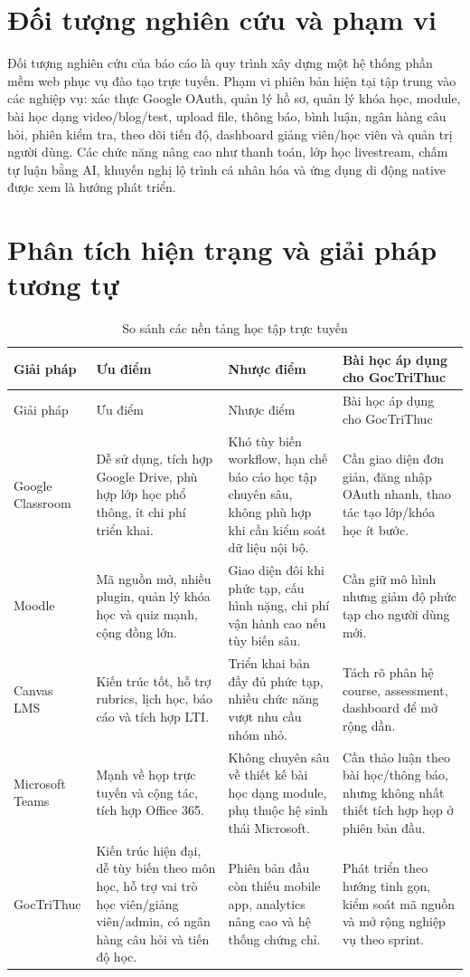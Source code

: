 \documentclass[12pt,a4paper]{report}
\newcommand{\projectname}{GocTriThuc}
\begin{document}
\section{Đối tượng nghiên cứu và phạm vi}
Đối tượng nghiên cứu của báo cáo là quy trình xây dựng một hệ thống phần mềm web phục vụ đào tạo trực tuyến. Phạm vi phiên bản hiện tại tập trung vào các nghiệp vụ: xác thực Google OAuth, quản lý hồ sơ, quản lý khóa học, module, bài học dạng video/blog/test, upload file, thông báo, bình luận, ngân hàng câu hỏi, phiên kiểm tra, theo dõi tiến độ, dashboard giảng viên/học viên và quản trị người dùng. Các chức năng nâng cao như thanh toán, lớp học livestream, chấm tự luận bằng AI, khuyến nghị lộ trình cá nhân hóa và ứng dụng di động native được xem là hướng phát triển.

\section{Phân tích hiện trạng và giải pháp tương tự}
\begin{longtable}{L{3cm} L{4.2cm} L{4.2cm} L{3.2cm}}
\caption{So sánh các nền tảng học tập trực tuyến}\label{tab:market}\\
\toprule
Giải pháp & Ưu điểm & Nhược điểm & Bài học áp dụng cho \projectname \\
\midrule
\endfirsthead
\toprule
Giải pháp & Ưu điểm & Nhược điểm & Bài học áp dụng cho \projectname \\
\midrule
\endhead
Google Classroom & Dễ sử dụng, tích hợp Google Drive, phù hợp lớp học phổ thông, ít chi phí triển khai. & Khó tùy biến workflow, hạn chế báo cáo học tập chuyên sâu, không phù hợp khi cần kiểm soát dữ liệu nội bộ. & Cần giao diện đơn giản, đăng nhập OAuth nhanh, thao tác tạo lớp/khóa học ít bước. \\
Moodle & Mã nguồn mở, nhiều plugin, quản lý khóa học và quiz mạnh, cộng đồng lớn. & Giao diện đôi khi phức tạp, cấu hình nặng, chi phí vận hành cao nếu tùy biến sâu. & Cần giữ mô hình  nhưng giảm độ phức tạp cho người dùng mới. \\
Canvas LMS & Kiến trúc tốt, hỗ trợ rubrics, lịch học, báo cáo và tích hợp LTI. & Triển khai bản đầy đủ phức tạp, nhiều chức năng vượt nhu cầu nhóm nhỏ. & Tách rõ phân hệ course, assessment, dashboard để mở rộng dần. \\
Microsoft Teams & Mạnh về họp trực tuyến và cộng tác, tích hợp Office 365. & Không chuyên sâu về thiết kế bài học dạng module, phụ thuộc hệ sinh thái Microsoft. & Cần thảo luận theo bài học/thông báo, nhưng không nhất thiết tích hợp họp ở phiên bản đầu. \\
\projectname & Kiến trúc hiện đại, dễ tùy biến theo môn học, hỗ trợ vai trò học viên/giảng viên/admin, có ngân hàng câu hỏi và tiến độ học. & Phiên bản đầu còn thiếu mobile app, analytics nâng cao và hệ thống chứng chỉ. & Phát triển theo hướng tinh gọn, kiểm soát mã nguồn và mở rộng nghiệp vụ theo sprint. \\
\bottomrule
\end{longtable}
\end{document}
